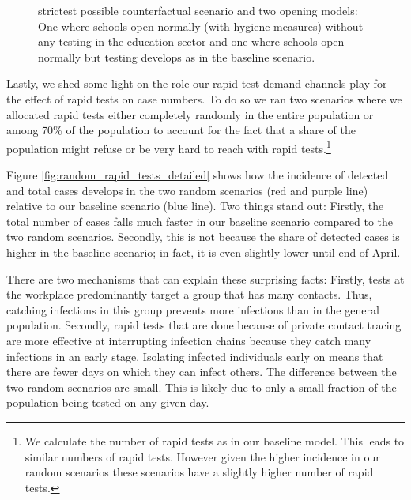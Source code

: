 \begin{figure}[ht]
{        strictest possible counterfactual scenario and two opening models: One where schools
        open normally (with hygiene measures) without any testing in the education sector and
        one where schools open normally but testing develops as in the baseline scenario.
    }
\end{figure}

\FloatBarrier

Lastly, we shed some light on the role our rapid test demand channels play for the
effect of rapid tests on case numbers. To do so we ran two scenarios where we allocated
rapid tests either completely randomly in the entire population or among 70\% of the
population to account for the fact that a share of the population might refuse or be
very hard to reach with rapid tests.\footnote{We calculate the number of rapid tests as
    in our baseline model. This leads to similar numbers of rapid tests. However given the
    higher incidence in our random scenarios these scenarios have a slightly higher number
    of rapid tests.}

Figure \ref{fig:random_rapid_tests_detailed} shows how the incidence of detected and
total cases develops in the two random scenarios (red and purple line) relative to our
baseline scenario (blue line). Two things stand out: Firstly, the total number of cases
falls much faster in our baseline scenario compared to the two random scenarios.
Secondly, this is not because the share of detected cases is higher in the baseline
scenario; in fact, it is even slightly lower until end of April.

There are two mechanisms that can explain these surprising facts: Firstly, tests at the
workplace predominantly target a group that has many contacts. Thus, catching infections
in this group prevents more infections than in the general population. Secondly, rapid
tests that are done because of private contact tracing are more effective at
interrupting infection chains because they catch many infections in an early stage.
Isolating infected individuals early on means that there are fewer days on which they
can infect others.
%
The difference between the two random scenarios are small. This is likely due to only a
small fraction of the population being tested on any given day.


